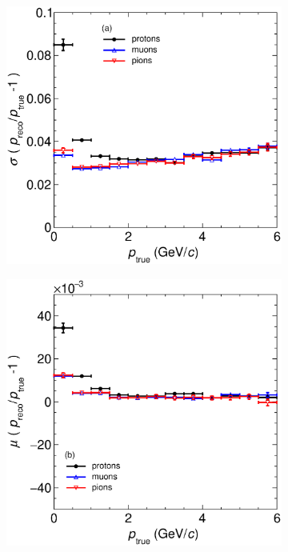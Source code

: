\begin{figure}[!ht]
     \centering
     \begin{subfigure}[b]{0.49\textwidth}
         \centering
         \includegraphics[width=\textwidth]{figures/ch5-KF_NDGAr/ToySample/HighPres/RespVSp_XL.eps}
         \caption{}
         \label{fig:ResND-GArVSp}
     \end{subfigure}
     \begin{subfigure}[b]{0.49\textwidth}
         \centering
         \includegraphics[width=\textwidth]{figures/ch5-KF_NDGAr/ToySample/HighPres/BiaspVSp_XL.eps}

\end{subfigure}
\end{figure}
